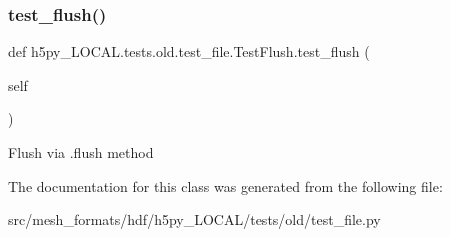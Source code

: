 \subsubsection{\texorpdfstring{test\+\_\+flush()}{test\_flush()}}
{\footnotesize\ttfamily def h5py\+\_\+\+L\+O\+C\+A\+L.\+tests.\+old.\+test\+\_\+file.\+Test\+Flush.\+test\+\_\+flush (\begin{DoxyParamCaption}\item[{}]{self }\end{DoxyParamCaption})}

\begin{DoxyVerb}Flush via .flush method \end{DoxyVerb}
 

The documentation for this class was generated from the following file\+:\begin{DoxyCompactItemize}
\item 
src/mesh\+\_\+formats/hdf/h5py\+\_\+\+L\+O\+C\+A\+L/tests/old/test\+\_\+file.\+py\end{DoxyCompactItemize}
